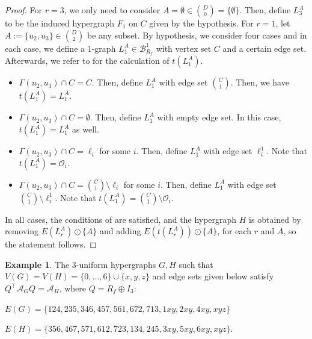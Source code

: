 \documentclass[12pt]{article}
\numberwithin{equation}{section}
\theoremstyle{definition}
\newtheorem{example}{Example}
\newcommand{\ev}[1]{( #1 )}
\begin{document}
\begin{proof}
For $r=3$, we only need to consider $A = \emptyset \in \binom{D}{0} = \{ \emptyset \}$. Then, define $L_3^{A}$ to be the induced hypergraph $F_1$ on $C$ given by the hypothesis. For $r=1$, let $A := \{ u_2, u_3 \} \in \binom{D}{2}$ be any subset. By hypothesis, we consider four cases and in each case, we define a $1$-graph $ L_1^{A} \in \mathcal{B}^1_{R_f} $ with vertex set $C$ and a certain edge set. Afterwards, we refer to  for the calculation of $t\ev{L_1^A}$. 
\begin{itemize}
\item $\Gamma(u_2,u_3) \cap C = C$. Then, define $L_1^{A}$ with edge set $\binom{C}{1}$. Then, we have $t\ev{L_1^{A}} = L_1^{A}$. 
\item $\Gamma(u_2,u_3) \cap C = \emptyset$. Then, define $ L_1^{A} $ with empty edge set. In this case, $t\ev{L_1^{A}} = L_1^{A}$ as well.
\item $\Gamma(u_2,u_3) \cap C = \ell_i$ for some $i$. Then, define $ L_1^{A} $ with edge set $\ell^1_i$. Note that $t\ev{L_1^{A}} = \mathcal{O}_{i}$. 
\item $\Gamma(u_2,u_3) \cap C = \binom{C}{1} \setminus \ell_i$ for some $i$. Then, define $ L_1^{A} $ with edge set $\binom{C}{1} \setminus \ell^1_i$. Note that $t\ev{L_1^{A}} = \binom{C}{1} \setminus \mathcal{O}_{i}$. 
\end{itemize} 
In all cases, the conditions of  are satisfied, and the hypergraph $H$ is obtained by removing $E\ev{L_r^{A}} \odot \{A\}$ and adding $E\ev{t\ev{ L_r^{A} }} \odot \{A\}$, for each $r$ and $A$, so the statement follows.
\end{proof}
\begin{example}
The $3$-uniform hypergraphs $G,H$ such that $V\ev{G} = V\ev{H} = \{ 0,\ldots, 6\} \cup \{x,y,z\}$ and edge sets given below satisfy $Q^\top \mathcal{A}_G Q = \mathcal{A}_H$, where $Q = R_{f} \oplus I_3$:

$ E\ev{G} = \{   124  ,  2 3 5 ,  3 4 6 ,  4 5 7 ,  5 6 1 ,  6 7 2 ,  7 1 3 ,  1 x y ,  2 x y ,  4 x y ,  x y z \} $

$ E\ev{H} = \{   3 5 6  ,  4 6 7 ,  5 7 1 ,  6 1 2 ,  7 2 3 ,  1 3 4 ,  2 4 5 ,  3 x y ,  5 x y ,  6 x y ,  x y z \}.$
\end{example}

\end{document}
